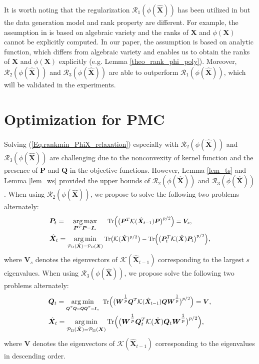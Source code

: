 \documentclass[letterpaper]{article} %
\begin{document}
It is worth noting that the regularization $\mathcal{R}_1(\phi(\hat{\bm{X}}))$ has been utilized in \cite{pmlr-v70-ongie17a,FANNLMC} but the data generation model and rank property are different.
For example, the assumption in \cite{pmlr-v70-ongie17a} is based on algebraic variety and the ranks of $\bm{X}$ and $\phi(\bm{X})$ cannot be explicitly computed. In our paper, the assumption is based on analytic function, which differs from algebraic variety and enables us to obtain the ranks of $\bm{X}$ and $\phi(\bm{X})$ explicitly (e.g. Lemma \ref{theo_rank_phi_poly}). Moreover, $\mathcal{R}_2(\phi(\hat{\bm{X}}))$ and $\mathcal{R}_3(\phi(\hat{\bm{X}}))$ are able to outperform $\mathcal{R}_1(\phi(\hat{\bm{X}}))$, which will be validated in the experiments.

\section{Optimization for PMC}
Solving (\ref{Eq.rankmin_PhiX_relaxation}) especially with $\mathcal{R}_2(\phi(\hat{\bm{X}}))$ and $\mathcal{R}_3(\phi(\hat{\bm{X}}))$ are challenging due to the nonconvexity of kernel function and the presence of $\bm{P}$ and $\bm{Q}$ in the objective functions. However, Lemma \ref{lem_ts} and Lemma \ref{lem_ws} provided the upper bounds of $\mathcal{R}_2(\phi(\hat{\bm{X}}))$ and $\mathcal{R}_3(\phi(\hat{\bm{X}}))$.
When using $\mathcal{R}_2(\phi(\hat{\bm{X}}))$, we propose to solve the following two problems alternately:
\begin{equation}\label{Eq.AM_S}
\begin{aligned}
&\bm{P}_t=\quad \mathop{\arg\max}_{\bm{P}^T\bm{P}=\bm{I}_s}\quad\ \scaleobj{0.9}{\textup{Tr}\Big(\big(\bm{P}^T\mathcal{K}(\hat{\bm{X}}_{t-1})\bm{P}\big)^{p/2}\Big)=\bm{V}_s},\\
&\hat{\bm{X}}_t=\mathop{\arg\min}_{\scaleobj{0.9}{\mathcal{P}_{\Omega}(\hat{\bm{X}})=\mathcal{P}_{\Omega}(\bm{X})}} \scaleobj{0.9}{\textup{Tr}\big(\mathcal{K}(\hat{\bm{X}})^{p/2}\big)-\textup{Tr}\Big(\big(\bm{P}_t^T\mathcal{K}(\hat{\bm{X}})\bm{P}_t\big)^{p/2}\Big)},
\end{aligned}
\end{equation}
where $\bm{V}_s$ denotes the eigenvectors of $\mathcal{K}(\hat{\bm{X}}_{t-1})$ corresponding to the largest $s$ eigenvalues.
When using $\mathcal{R}_3(\phi(\hat{\bm{X}}))$, we propose solve the following two problems alternately:
\begin{equation}\label{Eq.AM_W}
\begin{aligned}
&\bm{Q}_t=\mathop{\arg\min}_{\scaleobj{0.8}{\bm{Q}^T\bm{Q}=\bm{Q}\bm{Q}^T=\bm{I}_n}}\ \scaleobj{0.9}{\textup{Tr}\Big(\big(\bm{W}^{\tfrac{1}{p}}\bm{Q}^T\mathcal{K}(\hat{\bm{X}}_{t-1})\bm{Q}\bm{W}^{\tfrac{1}{p}}\big)^{p/2}\Big)}=\scaleobj{0.9}{\bm{V}},\\
&\hat{\bm{X}}_t=\mathop{\arg\min}_{\mathcal{P}_{\Omega}(\hat{\bm{X}})=\mathcal{P}_{\Omega}(\bm{X})} \textup{Tr}\Big(\big(\bm{W}^{\tfrac{1}{p}}\bm{Q}_t^T\mathcal{K}(\hat{\bm{X}})\bm{Q}_t\bm{W}^{\tfrac{1}{p}}\big)^{p/2}\Big),
\end{aligned}
\end{equation}
where $\bm{V}$ denotes the eigenvectors of $\mathcal{K}(\hat{\bm{X}}_{t-1})$ corresponding to the eigenvalues in descending order.
\end{document}
